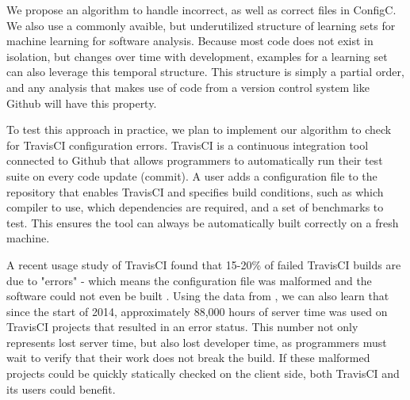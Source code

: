 We propose an algorithm to handle incorrect, as well as correct files in ConfigC.
We also use a commonly avaible, but underutilized structure of learning sets for machine learning for software analysis.
Because most code does not exist in isolation, but changes over time with development, examples for a learning set can also leverage this temporal structure. 
This structure is simply a partial order, and any analysis that makes use of code from a version control system like Github will have this property.

To test this approach in practice, we plan to implement our algorithm to check for TravisCI configuration errors.
TravisCI is a continuous integration tool connected to Github that allows programmers to automatically run their test suite on every code update (commit).
A user adds a configuration file to the repository that enables TravisCI and specifies build conditions, such as which compiler to use, which dependencies are required, and a set of benchmarks to test.
This ensures the tool can always be automatically built correctly on a fresh machine.

A recent usage study of TravisCI found that 15-20\% of failed TravisCI builds are due to "errors" - which means the configuration file was malformed and the software could not even be built \cite{API}.
Using the data from \cite{API}, we can also learn that since the start of 2014, approximately 88,000 hours of server time was used on TravisCI projects that resulted in an error status.
This number not only represents lost server time, but also lost developer time, as programmers must wait to verify that their work does not break the build.
If these malformed projects could be quickly statically checked on the client side, both TravisCI and its users could benefit.
